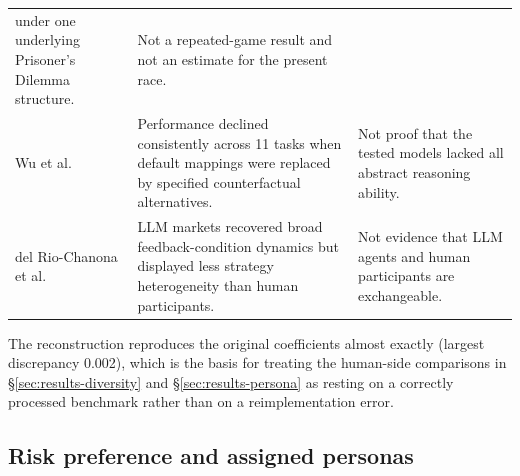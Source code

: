 \documentclass[sigconf]{aamas}
\begin{document}
\begin{table}[t]
\begin{tabular}{@{}p{}p{}p{}@{}}
under one underlying Prisoner's Dilemma structure. &
Not a repeated-game result and not an estimate for the present race. \\
Wu et al.~\citep{wuCounterfactual2024} &
Performance declined consistently across 11 tasks when default mappings were
replaced by specified counterfactual alternatives. &
Not proof that the tested models lacked all abstract reasoning ability. \\
del Rio-Chanona et al.~\citep{delRioChanonaMarkets2025} &
LLM markets recovered broad feedback-condition dynamics but displayed less
strategy heterogeneity than human participants. &
Not evidence that LLM agents and human participants are exchangeable. \\
\bottomrule
\end{tabular}
\end{table}

The reconstruction reproduces the original coefficients almost exactly
(largest discrepancy 0.002), which is the basis for treating the human-side
comparisons in \S\ref{sec:results-diversity} and
\S\ref{sec:results-persona} as resting on a correctly processed benchmark
rather than on a reimplementation error.

\subsection{Risk preference and assigned personas}
\label{app:persona-detail}
\end{document}

